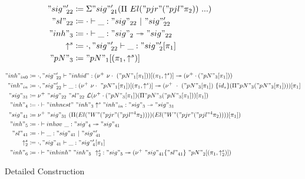 \begin{figure}
\begin{minipage}[t]{0.4\linewidth}
\begin{align*}
  "sig"_{22}' &\coloneqq \Sigma "sig"_{21}' (\Pi \ El ("pjr"  ("pjl" \pi_2)) \  ...) \\
  "sl"_{22} &\coloneqq { {\cdot} \vdash {\_} : {"sig"_{22}} \ |\ {"sig"_{22}'} } \\ 
  "inh"_3 &\coloneqq { {\cdot} \vdash {\_} : {"sig"_2} \twoheadrightarrow {"sig"_{22}}} \\ 
  \uparrow^s &\coloneqq { {\cdot, "sig"_{22}'} \vdash {\_} : {"sig"_2'[\pi_1]} } \\ 
  "pN"_3 &\coloneqq "pN"_1[(\pi_1, \uparrow^s)] \\ 
\end{align*}
  \end{minipage}

  \begin{minipage}{0.8\linewidth}
    \small
    \centering
    \begin{align*}
      "inh"_{in0} &\coloneqq \goodInh{\cdot, "sig"_{22}'}{"inhid"}{(\nu^+ \ \nu\cdot \ ("pN"_1[\pi_1]))[(\pi_1, \uparrow^s)]}{(\nu^+ \cdot ("pN"_3[\pi_1]))} \\
      "inh"_{in} &\coloneqq \goodInh{\cdot , "sig"_{22}'}{\_}{(\nu^+ \ \nu\cdot \ "pN"_1[\pi_1])[(\pi_1, \uparrow^s)]}{(\nu^+ \ \cdot \ ("pN"_3[\pi_1]) \ \{id_s\} (\Pi "pN"_3 ("pN"_3[\pi_1])) )[\pi_1]}\\
      "sig"_{31} &\coloneqq  \nu^+ \ "sig"_{22} \ {"sl"_{22}}\  \cL(\nu^+ \cdot ("pN"_3[\pi_1])  (\Pi "pN"_3 ("pN"_3[\pi_1]))[\pi_1]) \\ 
      "inh"_4 &\coloneqq \goodInh{\cdot}{"inhnest" \ "inh"_3 \uparrow^s "inh"_{in}}{"sig"_3}{"sig"_{31}} \\
      "sig"_{41} &\coloneqq {\nu^+ \ "sig"_{31} \ (\Pi (El ("W" ("pjr" ("pjl"^4 \pi_2)))) (El ("W" ("pjr" ("pjl"^4 \pi_2))))[\pi_1])} \\ 
      "inh"_5 &\coloneqq \goodInh{\cdot}{inhov \ \_}{"sig"_4}{"sig"_{41}} \\ 
      "sl"_{41} &\coloneqq \goodSeal{\cdot}{\_}{"sig"_{41}}{"sig"_{41}'} \\ 
      \uparrow^s_2 &\coloneqq \goodTerm{\cdot, "sig"_{41}}{\_}{"sig"_4'[\pi_1]} \\ 
      "inh"_6 &\coloneqq \goodInh{\cdot}{"inhinh" \ "inh"_5 \ \uparrow^s_2}{"sig"_5}{(\nu^+ \ "sig"_{41} \{"sl"_{41}\} \ "pN"_2[(\pi_1, \uparrow^s_2)])}
    \end{align*}  
  \end{minipage}
  \caption{Detailed Construction}\label{fig:example-construction}
\end{figure}





